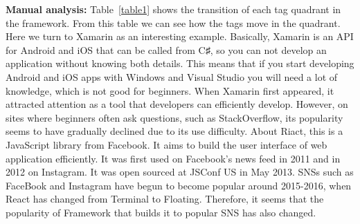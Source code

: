 \documentclass[english,preprint,JIP]{ipsj}
\begin{document}
\textbf{Manual analysis:}
Table~\ref{table1} shows the transition of each tag quadrant in the framework. From this table we can see how the tags move in the quadrant. Here we turn to Xamarin as an interesting example. Basically, Xamarin is an API for Android and iOS that can be called from C♯, so you can not develop an application without knowing both details. This means that if you start developing Android and iOS apps with Windows and Visual Studio you will need a lot of knowledge, which is not good for beginners. When Xamarin first appeared, it attracted attention as a tool that developers can efficiently develop. However, on sites where beginners often ask questions, such as StackOverflow, its popularity seems to have gradually declined due to its use difficulty.
About Riact, this is a JavaScript library from Facebook. It aims to build the user interface of web application efficiently. It was first used on Facebook's news feed in 2011 and in 2012 on Instagram. It was open sourced at JSConf US in May 2013. SNSs such as FaceBook and Instagram have begun to become popular around 2015-2016, when React has changed from Terminal to Floating. Therefore, it seems that the popularity of Framework that builds it to popular SNS has also changed.

\smallskip\smallskip
\end{document}
